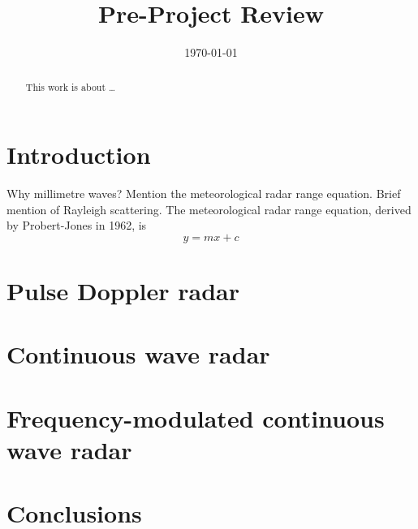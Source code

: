 \documentclass[sotoncolour]{uosarticle}
\title       {Pre-Project Review}
\date        {\today}
\begin{document}
\frontmatter
\maketitle
\begin{abstract}
This work is about \dots
\end{abstract}

\mainmatter

\section{Introduction} \label{sec:Introduction}
Why millimetre waves?
Mention the meteorological radar range equation.
Brief mention of Rayleigh scattering.
The meteorological radar range equation, derived by Probert-Jones in 1962, is\supercite{ProbertJones}
\begin{equation}
	y = m x + c\label{eqn:MeteoRange}
\end{equation}

\section{Pulse Doppler radar} \label{sec:PulseDopperRadar}

\section{Continuous wave radar} \label{sec:CWR}

\section{Frequency-modulated continuous wave radar} \label{sec:FMCWR}

\section{Conclusions} \label{sec:Conclusions}


\backmatter
\printbibliography
\end{document}
